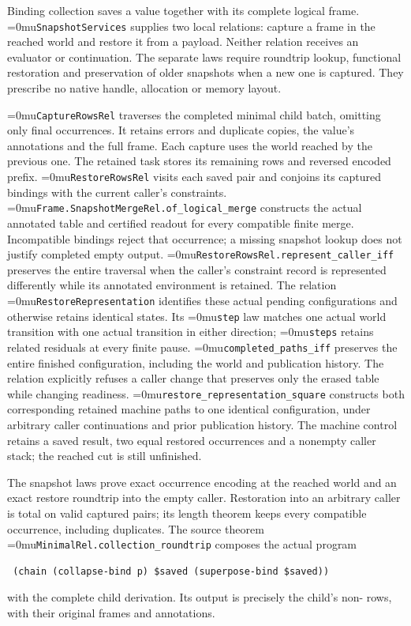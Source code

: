 \documentclass[11pt,a4paper]{article}
\newcommand{\code}[1]{\texttt{\detokenize{#1}}}
\newcommand{\name}[1]{\textup{\Urlmuskip=0mu\relax\nolinkurl{#1}}}
\begin{document}
Binding collection saves a value together with its complete logical frame.
\name{SnapshotServices} supplies two local relations: capture a frame in the
reached world and restore it from a payload. Neither relation receives an
evaluator or continuation. The separate laws require roundtrip lookup,
functional restoration and preservation of older snapshots when a new one
is captured. They prescribe no native handle, allocation or memory layout.

\name{CaptureRowsRel} traverses the completed minimal child batch, omitting
only final \code{Empty} occurrences. It retains errors and duplicate copies,
the value's annotations and the full frame. Each capture uses the world
reached by the previous one. The retained task stores its remaining rows and
reversed encoded prefix. \name{RestoreRowsRel} visits each saved pair and
conjoins its captured bindings with the current caller's constraints.
\name{Frame.SnapshotMergeRel.of_logical_merge} constructs the actual
annotated table and certified readout for every compatible finite merge.
Incompatible bindings reject that occurrence; a missing snapshot lookup
does not justify completed empty output.
\name{RestoreRowsRel.represent_caller_iff} preserves the entire traversal
when the caller's constraint record is represented differently while its
annotated environment is retained. The relation
\name{RestoreRepresentation} identifies these actual pending configurations
and otherwise retains identical states. Its \name{step} law matches one
actual world transition with one actual transition in either direction;
\name{steps} retains related residuals at every finite pause.
\name{completed_paths_iff} preserves the entire finished configuration,
including the world and publication history. The relation explicitly refuses
a caller change that preserves only the erased table while changing readiness.
\name{restore_representation_square}
constructs both corresponding retained machine paths to one identical
configuration, under arbitrary caller continuations and prior publication
history. The machine control retains a saved result, two equal restored
occurrences and a nonempty caller stack; the reached cut is still unfinished.

The snapshot laws prove exact occurrence encoding at the reached world and
an exact restore roundtrip into the empty caller. Restoration into an
arbitrary caller is total on valid captured pairs; its length theorem keeps
every compatible occurrence, including duplicates. The source theorem
\name{MinimalRel.collection_roundtrip} composes the actual program
\begin{verbatim}
 (chain (collapse-bind p) $saved (superpose-bind $saved))
\end{verbatim}
with the complete child derivation. Its output is precisely the child's
non-\code{Empty} rows, with their original frames and annotations.
\end{document}
